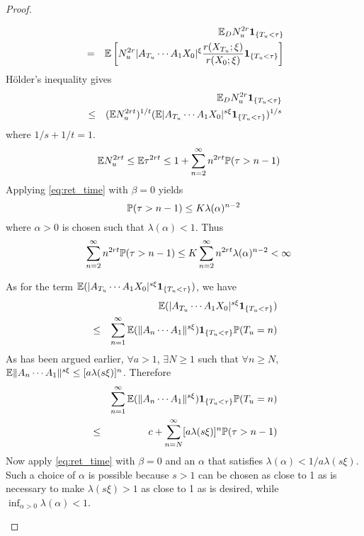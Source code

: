 \documentclass{article}
\begin{document}
\begin{proof}
\begin{enumerate}
\begin{enumerate}
\begin{eqnarray*}
        && \E_D N_u^{2r} \1{T_u < \tau} \\
        &=& \E \left[
          N_u^{2r} |A_{T_u} \cdots A_1 X_0|^{\xi}
          \frac{r(X_{T_u}; \xi)}{r(X_0; \xi)}
          \1{T_u < \tau}
        \right]
      \end{eqnarray*}
      H\"older's inequality gives
      \begin{eqnarray*}
        && \E_D N_u^{2r} \1{T_u < \tau} \\
        &\leq& (\E N_u^{2rt})^{1/t}
        (\E |A_{T_u} \cdots A_1 X_0|^{s\xi} \1{T_u < \tau})^{1/s}
      \end{eqnarray*}
      where $1/s + 1/t = 1$.
      \begin{eqnarray*}
        && \E N_u^{2rt} \leq \E \tau^{2rt} \leq 1 + \sum_{n=2}^\infty
        n^{2rt} \P(\tau > n-1)
      \end{eqnarray*}
      Applying \eqref{eq:ret_time} with $\beta=0$ yields
      \[
      \P(\tau > n-1) \leq K \lambda(\alpha)^{n-2}
      \]
      where $\alpha > 0$ is chosen such that $\lambda(\alpha) < 1$. Thus
      \begin{eqnarray*}
        && \sum_{n=2}^\infty n^{2rt} \P(\tau > n-1) \leq K \sum_{n=2}^\infty n^{2rt}
        \lambda(\alpha)^{n-2} < \infty
      \end{eqnarray*}
      
      As for the term $\E(|A_{T_u} \cdots A_1 X_0|^{s\xi} \1{T_u <
        \tau})$, we have
      \begin{eqnarray*}
        && \E(|A_{T_u} \cdots A_1 X_0|^{s\xi} \1{T_u < \tau}) \\
        &\leq& \sum_{n=1}^{\infty} \E(\|A_n \cdots A_1 \|^{s\xi})
        \1{T_u < \tau} \P(T_u = n)
      \end{eqnarray*}
      As has been argued earlier, $\forall a > 1$, $\exists N \geq 1$
      such that $\forall n \geq N$, $\E\|A_n \cdots A_1\|^{s\xi} \leq
      [a \lambda(s\xi)]^{n}$. Therefore
      \begin{eqnarray*}
        && \sum_{n=1}^{\infty} \E(\|A_n \cdots A_1 \|^{s\xi})
        \1{T_u < \tau} \P(T_u = n) \\
        &\leq& c + \sum_{n=N}^\infty [a \lambda(s\xi)]^{n}
        \P(\tau > n-1)
      \end{eqnarray*}
      Now apply \eqref{eq:ret_time} with $\beta = 0$ and an $\alpha$
      that satisfies $\lambda(\alpha) < 1/a\lambda(s\xi)$. Such a choice
      of $\alpha$ is possible because $s > 1$ can be chosen
      as close to 1 as is necessary to make $\lambda(s\xi) > 1$ as close
      to 1 as is desired, while $\inf_{\alpha > 0} \lambda(\alpha) <
      1$.


\end{enumerate}
\end{enumerate}
\end{proof}
\end{document}
